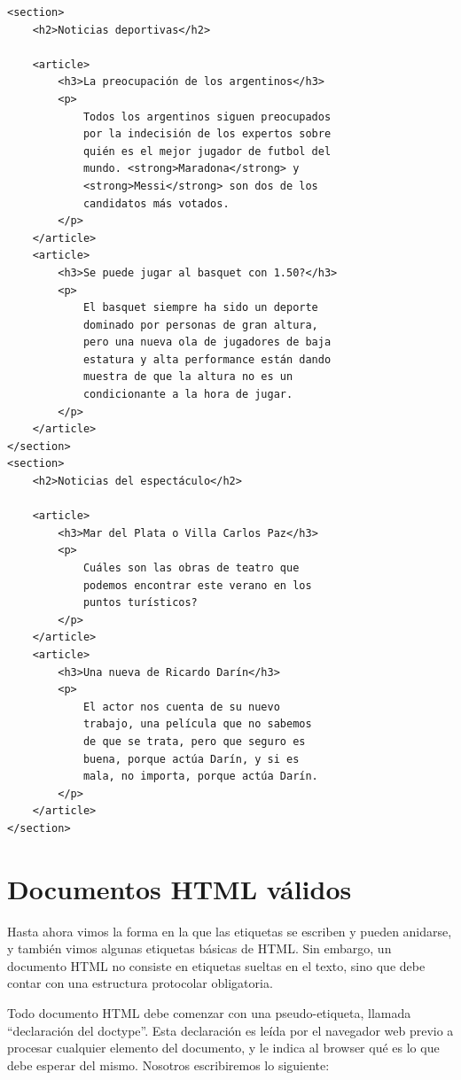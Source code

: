 \begin{lstlisting}[language=XHTML]
<section>
    <h2>Noticias deportivas</h2>

    <article>
        <h3>La preocupación de los argentinos</h3>
        <p>
            Todos los argentinos siguen preocupados
            por la indecisión de los expertos sobre
            quién es el mejor jugador de futbol del
            mundo. <strong>Maradona</strong> y
            <strong>Messi</strong> son dos de los
            candidatos más votados.
        </p>
    </article>
    <article>
        <h3>Se puede jugar al basquet con 1.50?</h3>
        <p>
            El basquet siempre ha sido un deporte
            dominado por personas de gran altura,
            pero una nueva ola de jugadores de baja
            estatura y alta performance están dando
            muestra de que la altura no es un
            condicionante a la hora de jugar.
        </p>
    </article>
</section>
<section>
    <h2>Noticias del espectáculo</h2>

    <article>
        <h3>Mar del Plata o Villa Carlos Paz</h3>
        <p>
            Cuáles son las obras de teatro que
            podemos encontrar este verano en los
            puntos turísticos?
        </p>
    </article>
    <article>
        <h3>Una nueva de Ricardo Darín</h3>
        <p>
            El actor nos cuenta de su nuevo
            trabajo, una película que no sabemos
            de que se trata, pero que seguro es
            buena, porque actúa Darín, y si es
            mala, no importa, porque actúa Darín.
        </p>
    </article>
</section>
\end{lstlisting}

\section{Documentos HTML válidos}

Hasta ahora vimos la forma en la que las etiquetas se escriben y pueden anidarse,
y también vimos algunas etiquetas básicas de HTML. Sin embargo, un documento
HTML no consiste en etiquetas sueltas en el texto, sino que debe contar con
una estructura protocolar obligatoria.

Todo documento HTML debe comenzar con una pseudo-etiqueta, llamada ``declaración
del doctype''. Esta declaración es leída por el navegador web previo a procesar
cualquier elemento del documento, y le indica al browser qué es lo que debe
esperar del mismo. Nosotros escribiremos lo siguiente:

